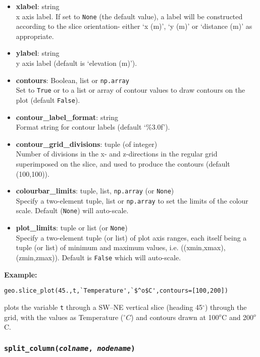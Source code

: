 \begin{itemize}
\item \textbf{xlabel}: string\\
  x axis label.  If set to \texttt{None} (the default value), a label will be constructed according to the slice orientation- either `x (m)', `y (m)' or `distance (m)' as appropriate.
\item \textbf{ylabel}: string\\
  y axis label (default is `elevation (m)').
\item \textbf{contours}: Boolean, list or \texttt{np.array}\\
  Set to \texttt{True} or to a list or array of contour values to draw contours on the plot (default \texttt{False}).
\item \textbf{contour\_label\_format}: string\\
  Format string for contour labels (default `\%3.0f').
\item \textbf{contour\_grid\_divisions}: tuple (of integer)\\
  Number of divisions in the x- and z-directions in the regular grid superimposed on the slice, and used to produce the contours (default (100,100)).
\item \textbf{colourbar\_limits}: tuple, list, \texttt{np.array} (or \texttt{None})\\
  Specify a two-element tuple, list or \texttt{np.array} to set the limits of the colour scale.  Default (\texttt{None}) will auto-scale.
\item \textbf{plot\_limits}: tuple or list (or \texttt{None})\\
  Specify a two-element tuple (or list) of plot axis ranges, each itself being a tuple (or list) of minimum and maximum values, i.e. ((xmin,xmax),(zmin,zmax)).  Default is \texttt{False} which will auto-scale.
\end{itemize}

\textbf{Example:}

\begin{verbatim}
geo.slice_plot(45.,t,`Temperature',`$^o$C',contours=[100,200])
\end{verbatim}

plots the variable \texttt{t} through a SW--NE vertical slice (heading 45$^{\circ}$) through the grid, with the values as Temperature ($^{\circ}C$) and contours drawn at 100$^o$C and 200$^o$C.

\subsubsection{\texttt{split\_column(\emph{colname}, \emph{nodename})}}

